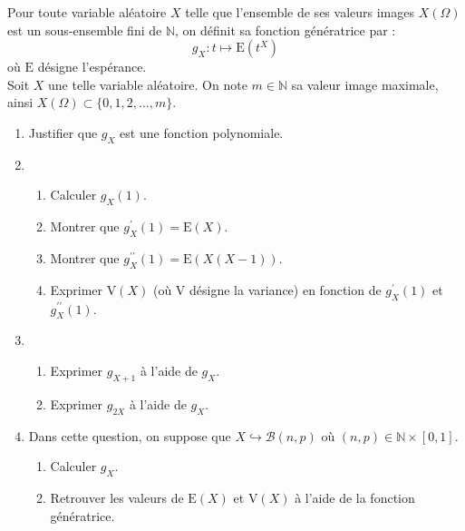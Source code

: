 



\begin{exercice}%
Pour toute variable aléatoire $X$ telle que l'ensemble de ses valeurs images $X(\Omega)$ est un sous-ensemble fini de $\mathbb{N}$, on définit sa fonction génératrice par :
$$g_{X}: t \mapsto \mathrm{E}\left(t^{X}\right) $$ où $\mathrm{E}$ désigne l'espérance.\\
Soit $X$ une telle variable aléatoire. On note $m \in \mathbb{N}$ sa valeur image maximale, ainsi $X(\Omega) \subset\{0,1,2, \ldots, m\}$.

\begin{enumerate}
  \item Justifier que $g_{X}$ est une fonction polynomiale.
  \item 
 \begin{enumerate}
\item   Calculer $g_{X}(1)$.
\item Montrer que $g_{X}^{\prime}(1)=\mathrm{E}(X)$.
\item  Montrer que $g_{X}^{\prime \prime}(1)=\mathrm{E}(X(X-1))$.
\item  Exprimer $\mathrm{V}(X)$ (où $\mathrm{V}$ désigne la variance) en fonction de $g_{X}^{\prime}(1)$ et $g_{X}^{\prime \prime}(1)$. 
\end{enumerate}  

  \item
  
 \begin{enumerate}
  \item  Exprimer $g_{X+1}$ à l'aide de $g_{X}$.
\item  Exprimer $g_{2 X}$ à l'aide de $g_{X}$.
\end{enumerate}  
  \item Dans cette question, on suppose que $X \hookrightarrow \mathcal{B}(n, p)$ où $(n, p) \in \mathbb{N} \times[0,1]$.
  
  \begin{enumerate}
\item  Calculer $g_{X}$.
\item  Retrouver les valeurs de $\mathrm{E}(X)$ et $\mathrm{V}(X)$ à l'aide de la fonction   génératrice.
  \end{enumerate}

\end{enumerate}
\end{exercice}

